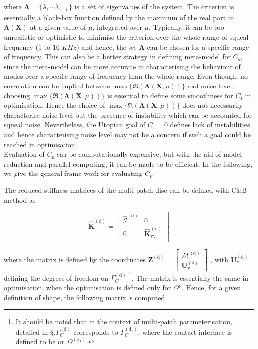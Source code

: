 where $\bm \Lambda=\{\lambda_1\cdots\lambda_{(.)}\}$ is a set of eigenvalues of the system. 
The criterion is essentially a black-box function defined by the maximum of the real part in $\bm \Lambda(\bm X)$ at a given value of ${\mu}$, integrated over ${\mu}$.
Typically, it can be too unrealistic or optimistic to minimise the criterion over the whole range of squeal frequency ($1$ to $16$ $KHz$) and hence, the set $\bm \Lambda$ can be chosen for a specific range of frequency.
This can also be a better strategy in defining meta-model for $C_{\mathsf s}$, since the meta-model can be more accurate in characterising the behaviour of modes over a specific range of frequency than the whole range.
Even though, no correlation can be implied between $\max\{\Re(\bm \Lambda(\bm X,{\mu}))\}$ and noise level, choosing $\max\{\Re(\bm \Lambda(\bm X,{\mu}))\}$ is essential to define some smoothness for $C_{\mathsf s}$ in optimisation. 
Hence the choice of $\max\{\Re(\bm \Lambda(\bm X,{\mu}))\}$ does not necessarily characterise noise level but the presence of instability which can be accounted for squeal noise. 
Nevertheless, the Utopian goal of $C_{\mathsf s}=0$ defines lack of instabilities and hence characterising noise level may not be a concern if such a goal could be reached in optimisation.\\

Evaluation of $C_{\mathsf s}$ can be computationally expensive, but with the aid of model reduction and parallel computing, it can be made to be efficient. In the following, we give the general frame-work for evaluating $C_{\mathsf s}$.

The reduced stiffness matrices of the multi-patch disc can be defined with C\&B method as

  \begin{equation}
 \mathbf{\hat{K}}^{\mathrm{(d)}}=\left[
\begin{array}{cccc}
  \mathcal{\hat I}^{(\mathrm d)} &0\\
  0&\mathbf{\hat{K}}_{\mathrm{vv}}^{(\mathrm d)} \\
\end{array}
\right] 
 \end{equation}

where the matrix is defined by the coordinates 
$\bm Z^{(\mathrm d)}= \left[\begin{array}{cc}
  \mathscr{M}^{(\mathrm d)} \\
  \bm U_{\mathrm{v}}^{(\mathrm d)} \end{array}\right]$
  , with $\bm U_{\mathrm{v}}^{(\mathrm d)}$ defining the degrees of freedom on $\Gamma_{C}^{(\mathrm d)}$ \footnote{It should be noted that in the context of multi-patch parameterisation, detailed in \S ,$\Gamma_{C}^{(\mathrm d)}$ corresponds to $\Gamma_{C}^{(\mathrm d_1)}$, where the contact interface is defined to be on $\Omega^{(\mathrm d_1)}$.}.
 The matrix is essentially the same in optimisation, when the optimisation is defined only for $\Omega^{\mathrm{p}}$. Hence, for a given definition of shape, the following matrix is computed
 
